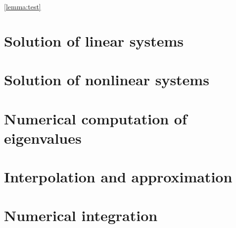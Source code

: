 \documentclass[11pt,a4paper]{report}
\begin{document}
\cref{lemma:test}

\chapter{Solution of linear systems}
\label{cha:solution_of_linear_systems}

\chapter{Solution of nonlinear systems}
\label{cha:solution_of_nonlinear_systems}

\chapter{Numerical computation of eigenvalues}%
\label{cha:numerical_computation_of_eigenvalues}

\chapter{Interpolation and approximation}%
\label{cha:interpolation_and_approximation}

\chapter{Numerical integration}
\label{cha:quadrature}

\nocite{*}
\printbibliography
\end{document}
